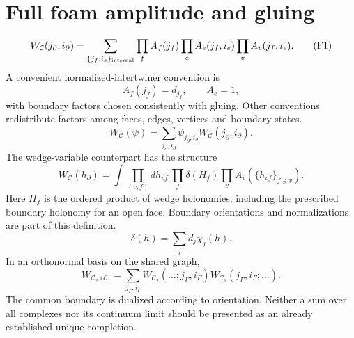 \documentclass[11pt,a4paper]{article}
\newcommand{\eq}[2]{\begin{equation}#2\tag{#1}\end{equation}}
\begin{document}
\section{Full foam amplitude and gluing}
\eq{F1}{W_{\mathcal C}(j_\partial,i_\partial)=\sum_{\{j_f,i_e\}_{\rm internal}}\prod_f A_f(j_f)\prod_e A_e(j_f,i_e)\prod_vA_v(j_f,i_e).}
A convenient normalized-intertwiner convention is
\eq{F2}{A_f(j_f)=d_{j_f},\qquad A_e=1,}
with boundary factors chosen consistently with gluing. Other conventions redistribute factors among faces, edges, vertices and boundary states.
\eq{F3}{W_{\mathcal C}(\psi)=\sum_{j_\partial,i_\partial}\psi_{j_\partial,i_\partial}W_{\mathcal C}(j_\partial,i_\partial).}
The wedge-variable counterpart has the structure
\eq{F4}{W_{\mathcal C}(h_\partial)=\int\prod_{(v,f)}dh_{vf}\,\prod_f\delta(H_f)\prod_vA_v(\{h_{vf}\}_{f\ni v}).}
Here $H_f$ is the ordered product of wedge holonomies, including the prescribed boundary holonomy for an open face. Boundary orientations and normalizations are part of this definition.
\eq{F5}{\delta(h)=\sum_jd_j\chi_j(h).}
In an orthonormal basis on the shared graph,
\eq{F6}{W_{\mathcal C_2\circ\mathcal C_1}=\sum_{j_\Gamma,i_\Gamma}W_{\mathcal C_2}(\ldots;j_\Gamma,i_\Gamma)W_{\mathcal C_1}(j_\Gamma,i_\Gamma;\ldots).}
The common boundary is dualized according to orientation. Neither a sum over all complexes nor its continuum limit should be presented as an already established unique completion.
\end{document}
